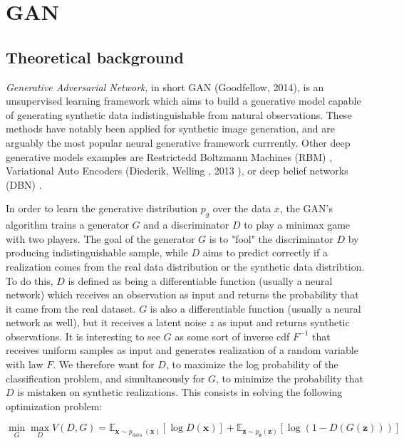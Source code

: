 \documentclass{article}
\begin{document}

\section{GAN}

\subsection{Theoretical background}

 \textit {Generative Adversarial Network}, in short GAN (Goodfellow, 2014), is an unsupervised learning framework which aims to build a generative model capable of generating  synthetic data indistinguishable from natural observations. These methods have notably been applied for synthetic image generation, and are arguably the most popular neural generative  framework currrently. Other deep generative models examples are Restrictedd Boltzmann Machines (RBM) , Variational Auto Encoders (Diederik, Welling , 2013 ), or deep belief networks (DBN) .

In order to learn the generative distribution $ p_ {g} $ over the  data $ x $, the GAN's algorithm trains a generator $G$ and a discriminator $D$ to play a minimax game with two players. The goal of the generator $G$ is to "fool" the discriminator $D$ by  producing  indistinguishable sample, while  $D$ aims to predict correctly if a realization comes from the real data distribution or the synthetic data distribtion. To do this, $D$ is defined as being a differentiable function (usually a neural network) which receives an observation as input and returns the probability that it came from the real dataset. $G$ is also a differentiable function (usually a neural network as well), but it receives a latent noise $z$  as input and returns synthetic observations. It is interesting to see $G$  as some sort of inverse cdf $F^{-1}$ that receives uniform samples  as input  and generates realization of a random variable with law $F$. We therefore want for $D$, to maximize the log probability of the classification problem, and simultaneously for $G$, to minimize the probability that $D$ is mistaken on synthetic realizations. This consists in solving the following optimization problem:

\begin{equation}
\min _{G} \max _{D} V(D, G)=\mathbb{E}_{\boldsymbol{x} \sim p_{\text {data }}(\boldsymbol{x})}[\log D(\boldsymbol{x})]+\mathbb{E}_{\boldsymbol{z} \sim p_{\boldsymbol{z}}(\boldsymbol{z})}[\log (1-D(G(\boldsymbol{z})))]
\end{equation}
\end{document}
